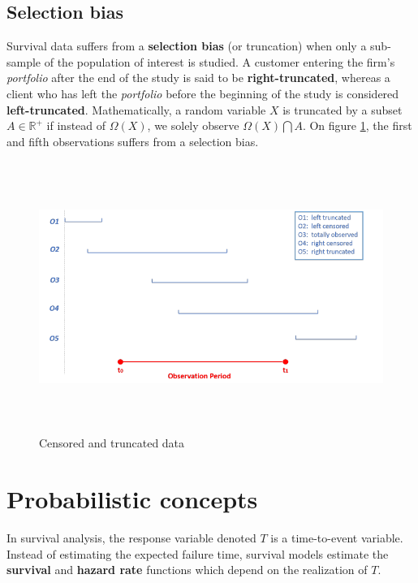 \documentclass[
]{book}
\begin{document}
\hypertarget{selection-bias}{%
\subsection{Selection bias}\label{selection-bias}}

Survival data suffers from a \textbf{selection bias} (or truncation) when only a sub-sample of the population of interest is studied. A customer entering the firm's \emph{portfolio} after the end of the study is said to be \textbf{right-truncated}, whereas a client who has left the \emph{portfolio} before the beginning of the study is considered \textbf{left-truncated}. Mathematically, a random variable \(X\) is truncated by a subset \(A \in \mathbb{R}^+\) if instead of \(\Omega(X)\), we solely observe \(\Omega(X)\bigcap A\). On figure \ref{fig:censoring}, the first and fifth observations suffers from a selection bias.

\begin{figure}

{\centering \includegraphics[width=500pt,height=250pt]{./imgs/censoring_and_truncation} 

}

\caption{Censored and truncated data}\label{fig:censoring}
\end{figure}

\hypertarget{probabilities}{%
\section{Probabilistic concepts}\label{probabilities}}

In survival analysis, the response variable denoted \(T\) is a time-to-event variable. Instead of estimating the expected failure time, survival models estimate the \textbf{survival} and \textbf{hazard rate} functions which depend on the realization of \(T\).
\end{document}
